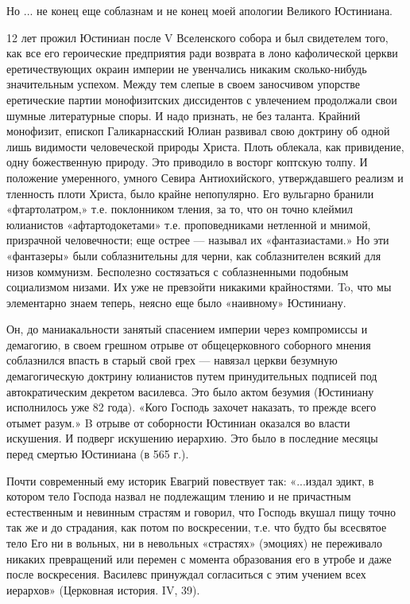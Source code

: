 Но ... не конец еще соблазнам и не конец моей апологии Великого Юстиниана.

12 лет прожил Юстиниан после V Вселенского собора и был свидетелем того, как
все его героические предприятия ради возврата в лоно кафолической церкви
еретичествующих окраин империи не увенчались никаким сколько-нибудь
значительным успехом. Между тем слепые в своем заносчивом упорстве еретические
партии монофизитских диссидентов с увлечением продолжали свои шумные
литературные споры. И надо признать, не без таланта. Крайний монофизит, епископ
Галикарнасский Юлиан развивал свою доктрину об одной лишь видимости
человеческой природы Христа. Плоть облекала, как привидение, одну божественную
природу. Это приводило в восторг коптскую толпу. И положение умеренного, умного
Севира Антиохийского, утверждавшего реализм и тленность плоти Христа, было
крайне непопулярно. Его вульгарно бранили «фтартолатром,» т.е. поклонником
тления, за то, что он точно клеймил юлианистов «афтартодокетами» т.е.
проповедниками нетленной и мнимой, призрачной человечности; еще острее ---
называл их «фантазиастами.» Но эти «фантазеры» были соблазнительны для черни,
как соблазнителен всякий для низов коммунизм. Бесполезно состязаться с
соблазненными подобным социализмом низами. Их уже не превзойти никакими
крайностями. To, что мы элементарно знаем теперь, неясно еще было «наивному»
Юстиниану.

Он, до маниакальности занятый спасением империи через компромиссы и демагогию,
в своем грешном отрыве от общецерковного соборного мнения соблазнился впасть в
старый свой грех --- навязал церкви безумную демагогическую доктрину юлианистов
путем принудительных подписей под автократическим декретом василевса. Это было
актом безумия (Юстиниану исполнилось уже 82 года). «Кого Господь захочет
наказать, то прежде всего отымет разум.» B отрыве от соборности Юстиниан
оказался во власти искушения. И подверг искушению иерархию. Это было в
последние месяцы перед смертью Юстиниана (в 565 г.).

Почти современный ему историк Евагрий повествует так: «...издал эдикт, в
котором тело Господа назвал не подлежащим тлению и не причастным естественным и
невинным страстям и говорил, что Господь вкушал пищу точно так же и до
страдания, как потом по воскресении, т.е. что будто бы всесвятое тело Его ни в
вольных, ни в невольных «страстях» (эмоциях) не переживало никаких превращений
или перемен с момента образования его в утробе и даже после воскресения.
Василевс принуждал согласиться с этим учением всех иерархов» (Церковная
история. IV, 39).

